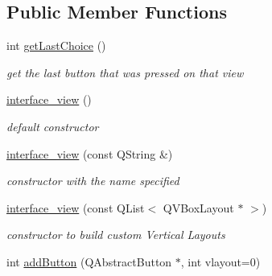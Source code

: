 \subsection*{Public Member Functions}
\begin{CompactItemize}
\item 
\hypertarget{classinterface__view_6c9506e36ddc99d55082b465e7fe89e7}{
int \hyperlink{classinterface__view_6c9506e36ddc99d55082b465e7fe89e7}{getLastChoice} ()}
\label{classinterface__view_6c9506e36ddc99d55082b465e7fe89e7}

\begin{CompactList}\small\item\em get the last button that was pressed on that view \item\end{CompactList}\item 
\hypertarget{classinterface__view_20cb4b527c4a0de449526e588e40498a}{
\hyperlink{classinterface__view_20cb4b527c4a0de449526e588e40498a}{interface\_\-view} ()}
\label{classinterface__view_20cb4b527c4a0de449526e588e40498a}

\begin{CompactList}\small\item\em default constructor \item\end{CompactList}\item 
\hypertarget{classinterface__view_3dc8b90c1b4ce4a59151ad7464e8fbb8}{
\hyperlink{classinterface__view_3dc8b90c1b4ce4a59151ad7464e8fbb8}{interface\_\-view} (const QString \&)}
\label{classinterface__view_3dc8b90c1b4ce4a59151ad7464e8fbb8}

\begin{CompactList}\small\item\em constructor with the name specified \item\end{CompactList}\item 
\hypertarget{classinterface__view_5df31c60fdf8e3f87143493a82b8357d}{
\hyperlink{classinterface__view_5df31c60fdf8e3f87143493a82b8357d}{interface\_\-view} (const QList$<$ QVBoxLayout $\ast$ $>$)}
\label{classinterface__view_5df31c60fdf8e3f87143493a82b8357d}

\begin{CompactList}\small\item\em constructor to build custom Vertical Layouts \item\end{CompactList}\item 
\hypertarget{classinterface__view_29c11da47c599da473ff2fe098454e00}{
int \hyperlink{classinterface__view_29c11da47c599da473ff2fe098454e00}{addButton} (QAbstractButton $\ast$, int vlayout=0)}
\label{classinterface__view_29c11da47c599da473ff2fe098454e00}


\end{CompactItemize}
